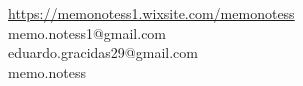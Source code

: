 \documentclass[9pt,a4paper,twoside]{rho-class/rho}
\begin{document}
    \noindent\faWix\hspace{5pt}\href{https://memonotess1.wixsite.com/memonotess}{https://memonotess1.wixsite.com/memonotess} \\
    \faEnvelope[regular]\hspace{7pt}memo.notess1@gmail.com \\
    \faEnvelope[regular]\hspace{7pt}eduardo.gracidas29@gmail.com \\
    \faInstagram\hspace{8pt}memo.notess
        

\printbibliography

\end{document}

